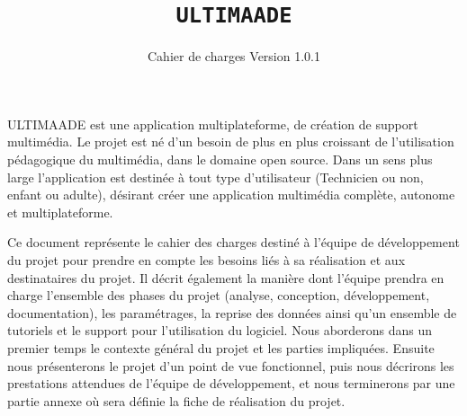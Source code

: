 \documentclass{ultimaade-fr}
\begin{document}
\title{\texttt{ULTIMAADE}}
\subtitle{Cahier de charges Version 1.0.1}

\date{}

\summary
{ 
  ULTIMAADE est une application multiplateforme, de création de support multimédia. Le projet  est  né d’un  besoin  de  plus  en  plus  croissant	de  l'utilisation  pédagogique  du multimédia, dans le domaine open source.
  Dans un sens plus large l'application est destinée à tout type d'utilisateur (Technicien ou non, enfant ou adulte), désirant créer une application multimédia complète, autonome et multiplateforme.

  Ce document représente le cahier des charges destiné à l’équipe de développement du projet pour  prendre en compte les besoins liés à sa réalisation et aux destinataires du projet.
  Il décrit également la manière dont l’équipe prendra en charge l’ensemble des phases du projet (analyse, conception, développement, documentation), les paramétrages, la reprise des données ainsi qu’un ensemble de tutoriels et le support pour l’utilisation du logiciel. Nous  aborderons  dans  un  premier  temps  le  contexte  général  du  projet et  les  parties
  impliquées. Ensuite nous présenterons le projet d’un point de vue fonctionnel, puis nous décrirons les prestations attendues de l’équipe de développement, et nous terminerons par une partie annexe où sera définie la fiche de réalisation du projet.

}


\maketitle

\tableofcontents

\renewcommand{\labelitemi}{$\bullet$}
\renewcommand{\labelitemii}{$\circ$}



\newpage
\end{document}
